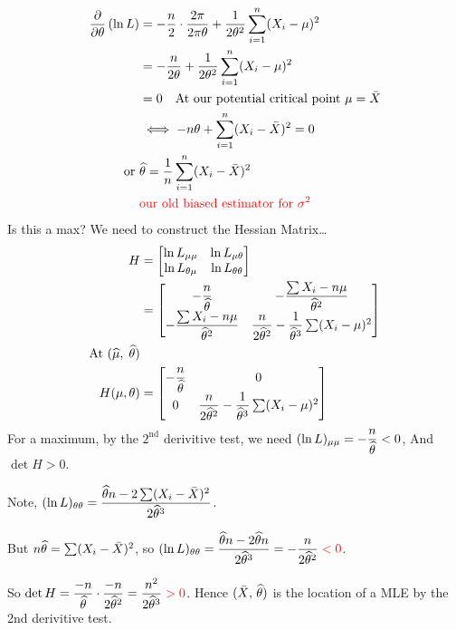 \begin{align*}
    \pdv{}{\theta}\pars{\ln L} &= -\frac{n}{2} \cdot \frac{2\pi}{2\pi\theta} + \over{2\theta^2} \sum_{i=1}^n(X_i-\mu)^2\\
    &= -\frac{n}{2\theta} + \over{2\theta^2} \sum_{i=1}^n(X_i-\mu)^2\\
    &= 0 \quad \text{At our potential critical point } \mu = \Xbar\\
    &\iff -n\theta + \sum_{i=1}^n(X_i-\Xbar)^2 = 0\\
    \text{or } & \that = \over{n}\sum_{i=1}^n(X_i-\Xbar)^2\\
    & \red{\text{our old biased estimator for } \sigma^2}
\end{align*}
Is this a max? We need to construct the Hessian Matrix\dots
\begin{align*}
    H &= \begin{bmatrix}{\ln L_{\mu\mu}} & {\ln L_{\mu\theta}}\\{\ln L_{\theta\mu}}&{\ln L_{\theta\theta}}\end{bmatrix}\\
    &= \begin{bmatrix}{-\dfrac{n}{\widehat{\theta}}} & {-\dfrac{\sum X_i - n\mu }{\widehat{\theta}^2}}\\{-\dfrac{\sum X_i - n\mu }{\widehat{\theta}^2}}&{\dfrac{n}{2\widehat{\theta}^2}-\dfrac{1}{\widehat{\theta}^3} \sum(X_i-\mu)^2}\end{bmatrix}\\
    \text{At } (\widehat{\mu},\;\widehat{\theta}) \\
    H(\mu, \theta) &= \begin{bmatrix}{-\dfrac{n}{\widehat{\theta}}} & {0}\\{0}&{\dfrac{n}{2\widehat{\theta}^2}-\dfrac{1}{\widehat{\theta}^3} \sum(X_i-\mu)^2}\end{bmatrix}
\end{align*}
For a maximum, by the $2^{\text{nd}}$ derivitive test, we need $(\ln L)_{\mu\mu} = -\dfrac{n}{\widehat{\theta}} < 0$, \hspace{.1cm}  And $\det H > 0$.

\nl Note, $\displaystyle (\ln L)_{\theta\theta} = \dfrac{\widehat{\theta} n - 2 \sum(X_i - \bar{X})^2}{2 \widehat{\theta}^3}$.

\nl But $n\widehat{\theta} = \sum (X_i - \bar{X})^2$, so $\displaystyle (\ln L)_{\theta\theta} = \dfrac{\widehat{\theta} n - 2 \widehat{\theta} n}{2 \widehat{\theta}^3} = - \frac{n}{2\widehat{\theta}^2} \;\color{red}{ < 0}\color{black}$.

\nl So $\displaystyle \det H = \dfrac{-n}{\widehat{\theta}} \cdot \dfrac{-n}{2\widehat{\theta}^2} = \dfrac{n^2}{2\widehat{\theta}^3}\;\color{red}{ > 0 }\color{black}$. Hence $(\bar{X},\, \widehat{\theta})$ is the location of a MLE by the 2nd derivitive test.

